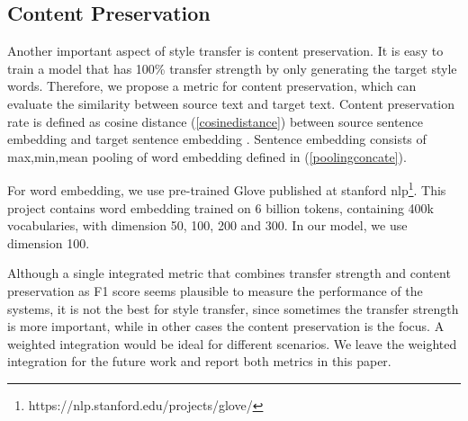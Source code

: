 \documentclass[letterpaper]{article} \usepackage{aaai18}  \usepackage{times}  \usepackage{helvet}  \usepackage{courier}  \usepackage{url}  \usepackage{graphicx}  \usepackage{amsmath}
\begin{document}
\subsection{Content Preservation}
Another important aspect of style transfer is content preservation. 
It is easy to train a model that has 100\% transfer strength by only generating the target style words. 
Therefore, we propose a metric for content preservation, which can evaluate the similarity between source text and target text. 
Content preservation rate is defined as cosine distance (\ref{cosinedistance}) between source sentence embedding  
and target sentence embedding . 
Sentence embedding consists of max,min,mean pooling of word embedding defined in (\ref{poolingconcate}).
{\small

}For word embedding, we use pre-trained Glove \cite{pennington2014glove} published at 
stanford nlp\footnote{https://nlp.stanford.edu/projects/glove/}. 
This project contains word embedding trained on 6 billion tokens, 
containing 400k vocabularies, with dimension 50, 100, 200 and 300. 
In our model, we use dimension 100.

Although a single integrated metric that combines transfer strength and content preservation as F1 score 
seems plausible to measure the performance of the systems, it is not the best for style transfer, since sometimes the transfer 
strength is more important, while in other cases the content preservation is the focus.
A weighted integration would be ideal for different scenarios. We leave the weighted integration for the 
future work and report both metrics in this paper.


\begin{table}[t]
\centering
{}
\caption{Size of datasets}
\label{table_data}
\end{table}
\end{document}
